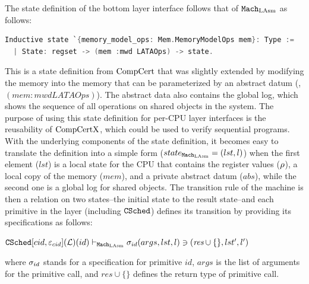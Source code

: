 The state definition of the bottom layer interface follows that of ${\mathrm{\texttt{Mach}}}_{\mathrm{LAsm}}$ as follows:
\begin{lstlisting}[language=C]
Inductive state `{memory_model_ops: Mem.MemoryModelOps mem}: Type :=
  | State: regset -> (mem :mwd LATAOps) -> state.
\end{lstlisting}
This  is a state definition from $\mathrm{CompCert}$ that was slightly extended by modifying the memory 
into the memory that can be parameterized by an abstract datum (\ie, $(mem :mwd LATAOps)$).
The abstract data also contains the global log, which shows the sequence of all operations on shared objects in the system. 
The purpose of using this state definition for  per-CPU  layer interfaces is the reusability of $\mathrm{CompCertX}$, which could be used to verify sequential programs. 
With the underlying components of the state definition, 
 it becomes easy  to translate the definition into a simple form ($state_{{\mathrm{\texttt{Mach}}}_{\mathrm{LAsm}}} = (lst, l)$) when the first element ($lst$) is a local state for the
 CPU that contains 
the register values ($\rho$), a local copy of the memory ($mem$), and a private abstract datum ($abs$), while the second  one is a global log for shared objects.
%
The transition rule of the machine is then a relation on two states--the initial state to the result state--and each primitive in the layer (including ${{\mathrm{\texttt{CSched}}}}$) defines its transition  by providing its specifications as follows:
\begin{center}
${{\mathrm{\texttt{CSched}}}}[cid, {\varepsilon}_{cid}](\mathcal{L})(id)
 \vdash_{{\mathrm{\texttt{Mach}}}_{\mathrm{LAsm}}}  \sigma_{id}(args, lst, l) \ni (\textit{res}\cup \{\}, lst', l')$
\end{center}
{\noindent}where $\sigma_{id}$ stands for a specification for primitive $id$,
$args$ is the list of arguments for the primitive call, and $\textit{res}\cup \{\}$ defines the 
return type of  primitive call.


